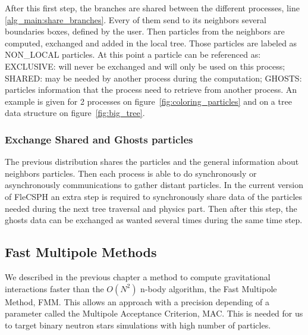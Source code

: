 After this first step, the branches are shared between the different processes, line \ref{alg_main:share_branches}. 
Every of them send to its neighbors several boundaries boxes, defined by the user. 
Then particles from the neighbors are computed, exchanged and added in the local tree. 
Those particles are labeled as NON\_LOCAL particles. 
At this point a particle can be referenced as: EXCLUSIVE: will never be exchanged and will only be used on this process; SHARED: may be needed by another process during the computation; GHOSTS: particles information that the process need to retrieve from another process. 
An example is given for 2 processes on figure~\ref{fig:coloring_particles} and on a tree data structure on figure~\ref{fig:big_tree}.

\subsubsection{Exchange Shared and Ghosts particles}

The previous distribution shares the particles and the general information about neighbors particles. 
Then each process is able to do synchronously or asynchronously communications to gather distant particles. 
In the current version of FleCSPH an extra step is required to synchronously share data of the particles needed during the next tree traversal and physics part. 
Then after this step, the ghosts data can be exchanged as wanted several times during the same time step. 

\subsection{Fast Multipole Methods}

We described in the previous chapter a method to compute gravitational interactions faster than the $O(N^2)$ n-body algorithm, the Fast Multipole Method, FMM.
This allows an approach with a precision depending of a parameter called the Multipole Acceptance Criterion, MAC. 
This is needed for us to target binary neutron stars simulations with high number of particles.

